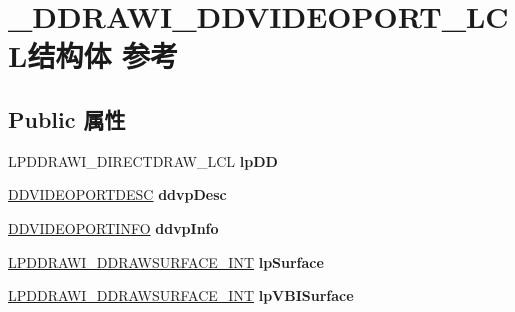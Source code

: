 \hypertarget{struct___d_d_r_a_w_i___d_d_v_i_d_e_o_p_o_r_t___l_c_l}{}\section{\+\_\+\+D\+D\+R\+A\+W\+I\+\_\+\+D\+D\+V\+I\+D\+E\+O\+P\+O\+R\+T\+\_\+\+L\+C\+L结构体 参考}
\label{struct___d_d_r_a_w_i___d_d_v_i_d_e_o_p_o_r_t___l_c_l}
\subsection*{Public 属性}
\begin{DoxyCompactItemize}
\item 
\mbox{\label{struct___d_d_r_a_w_i___d_d_v_i_d_e_o_p_o_r_t___l_c_l_aa7119a6097117e13f6fc9d5f1f61ac52}} 
L\+P\+D\+D\+R\+A\+W\+I\+\_\+\+D\+I\+R\+E\+C\+T\+D\+R\+A\+W\+\_\+\+L\+CL {\bfseries lp\+DD}
\item 
\mbox{\label{struct___d_d_r_a_w_i___d_d_v_i_d_e_o_p_o_r_t___l_c_l_a08038766ec5f7232bf397e30468b1e27}} 
\hyperlink{struct___d_d_v_i_d_e_o_p_o_r_t_d_e_s_c}{D\+D\+V\+I\+D\+E\+O\+P\+O\+R\+T\+D\+E\+SC} {\bfseries ddvp\+Desc}
\item 
\mbox{\label{struct___d_d_r_a_w_i___d_d_v_i_d_e_o_p_o_r_t___l_c_l_ad115c49d0eacc683f44f8d5fd5e1ddba}} 
\hyperlink{struct___d_d_v_i_d_e_o_p_o_r_t_i_n_f_o}{D\+D\+V\+I\+D\+E\+O\+P\+O\+R\+T\+I\+N\+FO} {\bfseries ddvp\+Info}
\item 
\mbox{\label{struct___d_d_r_a_w_i___d_d_v_i_d_e_o_p_o_r_t___l_c_l_a8ecb0f6218c6d186684f3c46bf3a480a}} 
\hyperlink{struct___d_d_r_a_w_i___d_d_r_a_w_s_u_r_f_a_c_e___i_n_t}{L\+P\+D\+D\+R\+A\+W\+I\+\_\+\+D\+D\+R\+A\+W\+S\+U\+R\+F\+A\+C\+E\+\_\+\+I\+NT} {\bfseries lp\+Surface}
\item 
\mbox{\label{struct___d_d_r_a_w_i___d_d_v_i_d_e_o_p_o_r_t___l_c_l_a0705560677237336089c56c072a39bae}} 
\hyperlink{struct___d_d_r_a_w_i___d_d_r_a_w_s_u_r_f_a_c_e___i_n_t}{L\+P\+D\+D\+R\+A\+W\+I\+\_\+\+D\+D\+R\+A\+W\+S\+U\+R\+F\+A\+C\+E\+\_\+\+I\+NT} {\bfseries lp\+V\+B\+I\+Surface}

\end{DoxyCompactItemize}
